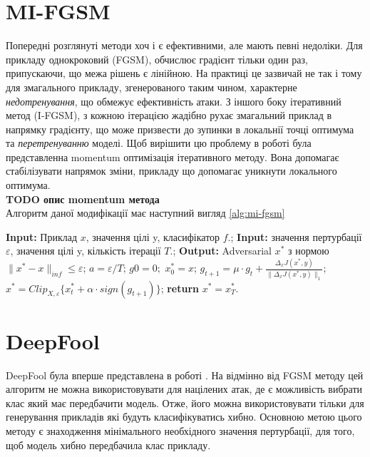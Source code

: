 \documentclass[a4paper,14pt]{extreport}
\renewcommand{\algorithmicrequire}{\textbf{Input: }}
\renewcommand{\algorithmicensure}{\textbf{Output: }}
\newcommand{\algorithmreturn}{\textbf{return }}
\begin{document}
	\section{MI-FGSM}	
	Попередні розглянуті методи хоч і є ефективними, але мають певні недоліки.
	Для прикладу однокроковий (FGSM), обчислює градієнт тільки один раз, припускаючи, що межа рішень є лінійною. На практиці це зазвичай не так і тому для змагального прикладу, згенерованого таким чином, характерне \textit{недотренування}, що обмежує ефективність атаки. З іншого боку ітеративний метод (I-FGSM), з кожною ітерацією жадібно рухає змагальний приклад в напрямку градієнту, що може призвести до зупинки в локальнії точці оптимума та \textit{перетренуванню} моделі. Щоб вирішити цю проблему в роботі \textcite{dong2017boosting} була представленна momentum оптимізація ітеративного методу. Вона допомагає стабілізувати напрямок зміни, прикладу що допомагає уникнути локального оптимума.
	\\{\textbf{TODO опис momentum метода}}  \\
	Алгоритм даної модифікації має наступний вигляд \ref{alg:mi-fgsm}	
	\begin{algorithm}
		\caption{$MI-FGSM$}
		\label{alg:mi-fgsm}
		\begin{algorithmic}[1]
			\State \algorithmicrequire{Приклад $x$, значення цілі y, класифікатор $f$.};
			\State \algorithmicrequire{значення пертурбації $\varepsilon$, значення цілі y, кількість ітерації $T$.};
			\State \algorithmicensure{ Adversarial $x^{*}$ з нормою $\|x^{*} - x\|_{inf} \leq \varepsilon $};
			\State $a = \varepsilon / T$;
			\State $g0 = 0;$ $x^{*}_0 = x$;
			\State $g_{t+1} = \mu \cdot g_t + \frac{\Delta_x J(x^{*}, y)}{\|\Delta_x J(x^{*}, y)\|_1}$;
			\State $x^{*} = Clip_{X, \varepsilon} \big\{ x^{*}_{t} + \alpha \cdot sign(g_{t+1}) \big\}$;
			\EndFor
			\State \algorithmreturn{$x^{*} = x^{*}_{T}$}.
		\end{algorithmic}
	\end{algorithm}
	
	\newpage
	\section{DeepFool}
	DeepFool була вперше представлена в роботі \textcite{moosavidezfooli2015deepfool}. На відмінно від FGSM методу цей алгоритм не можна використовувати для націлених атак, де є можливість вибрати клас який має передбачити модель. Отже, його можна використовувати тільки для генерування прикладів які будуть класифікуватись хибно. Основною метою цього методу є знаходження мінімального необхідного значення пертурбації, для того, щоб модель хибно передбачила клас прикладу.
	
\end{document}
